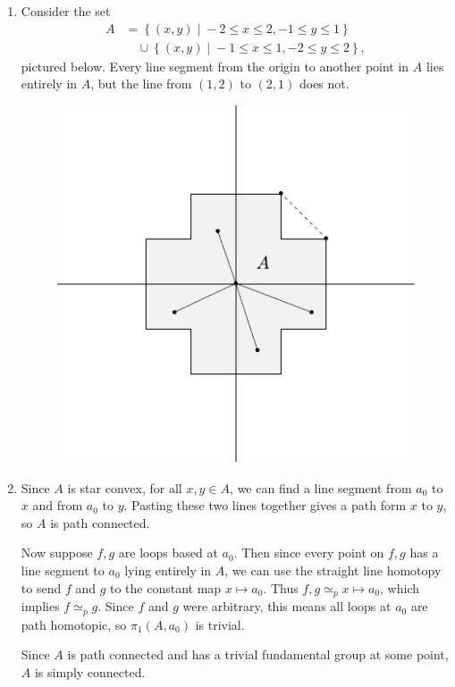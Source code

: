 \documentclass[10pt]{report}
\begin{document}
\begin{enumerate}
	\item Consider the set
		\begin{align*}
			A &= \left\{ (x,y) \;|\; -2 \leq x \leq 2, -1 \leq y \leq 1 \right\} \\
			&\quad \cup \left\{ (x,y) \;|\; -1 \leq x \leq 1, -2 \leq y \leq 2 \right\},
		\end{align*}
		pictured below. Every line segment from the origin to another point in $A$ lies entirely in $A$, but the line from $(1,2)$ to $(2,1)$ does not.
		\begin{figure}[H]
			\centering
			\includegraphics[scale=0.8]{fig/star.pdf}
		\end{figure}

	\item Since $A$ is star convex, for all $x,y \in A$, we can find a line segment from $a_0$ to $x$ and from $a_0$ to $y$. Pasting these two lines together gives a path form $x$ to $y$, so $A$ is path connected.

		Now suppose $f,g$ are loops based at $a_0$. Then since every point on $f,g$ has a line segment to $a_0$ lying entirely in $A$, we can use the straight line homotopy to send $f$ and $g$ to the constant map $x \mapsto a_0$. Thus $f,g \simeq_{p} x \mapsto a_0$, which implies $f \simeq_{p} g$. Since $f$ and $g$ were arbitrary, this means all loops at $a_0$ are path homotopic, so $\pi_1(A,a_0)$ is trivial.

		Since $A$ is path connected and has a trivial fundamental group at some point, $A$ is simply connected.
\end{enumerate}
\end{document}
